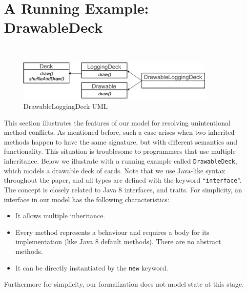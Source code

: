 \section{A Running Example: DrawableDeck}~\label{sec:overview}

\begin{figure}[t]
\centering
\includegraphics[height=2cm]{pics/DrawableLoggingDeck.pdf}
\caption{DrawableLoggingDeck UML}\label{fig:subtyping}
\end{figure}


This section illustrates the features of our \MIM{} model for
resolving unintentional method conflicts. As mentioned before, such a
case arises when two inherited methods happen to have the same
signature, but with different semantics and functionality. This
situation is troublesome to programmers that use multiple
inheritance. Below we illustrate with a running example called
\lstinline|DrawableDeck|, which models a drawable deck of cards. 
Note that we use Java-like syntax
throughout the paper, and all types are defined with the keyword
``\lstinline|interface|''. The concept is closely related to Java 8
interfaces, and traits. For simplicity, an interface in our model has
the following characteristics:
\begin{itemize}
	\item It allows multiple inheritance.
	\item Every method represents a behaviour and requires a body for its implementation (like Java 8 default methods). There are no abstract methods.
	\item It can be directly instantiated by the \lstinline|new| keyword.
\end{itemize}
Furthermore for simplicity, our formalization does not model state at
this stage. %

